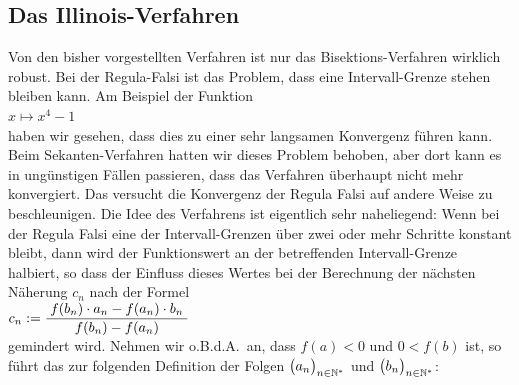 \subsection{Das Illinois-Verfahren}
Von den bisher vorgestellten Verfahren ist nur das Bisektions-Verfahren wirklich robust.
Bei der Regula-Falsi ist das Problem, dass eine Intervall-Grenze stehen bleiben kann. Am
Beispiel der Funktion
\\[0.2cm]
\hspace*{1.3cm}
 $x \mapsto x^4 - 1$ 
\\[0.2cm]
haben wir gesehen, dass dies zu einer sehr
langsamen Konvergenz f\"uhren kann.  Beim Sekanten-Verfahren hatten wir dieses Problem
behoben, aber dort kann es in ung\"unstigen F\"allen passieren, dass das Verfahren \"uberhaupt nicht mehr
konvergiert.  Das  \cite{dowell:1971} versucht die Konvergenz der Regula Falsi
auf andere Weise zu beschleunigen.  Die Idee des Verfahrens ist eigentlich sehr naheliegend:
Wenn bei der Regula Falsi eine der Intervall-Grenzen \"uber zwei oder mehr Schritte konstant bleibt,
dann wird der Funktionswert an der betreffenden Intervall-Grenze halbiert, so dass der Einfluss dieses
Wertes bei der Berechnung der n\"achsten N\"aherung $c_n$ nach der Formel
\\[0.2cm]
\hspace*{1.3cm}
$c_n := \displaystyle\frac{\;\displaystyle f(b_n) \cdot a_n - f(a_n) \cdot b_n\;}{\;\displaystyle f(b_n) - f(a_n)\;}$
\\[0.2cm]
gemindert wird.  Nehmen wir o.B.d.A.~an, dass $f(a) < 0$ und $0 < f(b)$ ist, so f\"uhrt das zur folgenden 
Definition der Folgen $\bigl(a_n\bigr)_{n\in\mathbb{N}^*}$ und $\bigl(b_n\bigr)_{n\in\mathbb{N}^*}$:

